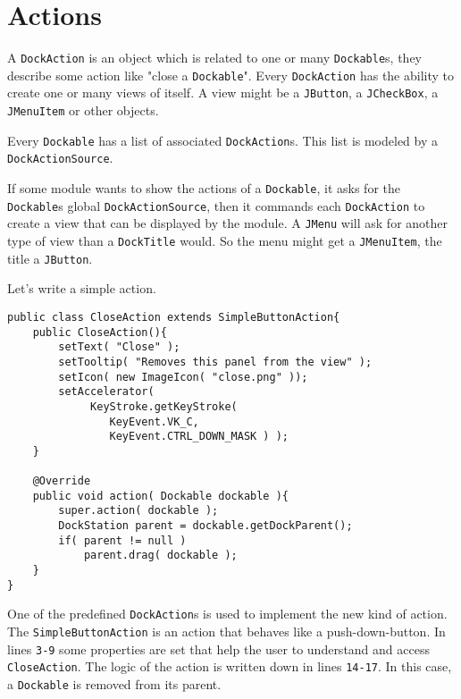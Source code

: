 \documentclass[a4paper,10pt]{article}
\newcommand{\src}[1]{\lstinline[basicstyle=\normalsize\ttfamily,keywordstyle=\normalsize\ttfamily,identifierstyle=\normalsize\ttfamily]|#1|}
\begin{document}
\section{Actions}
A \src{DockAction} is an object which is related to one or many \src{Dockable}s, they describe some action like "close a \src{Dockable}". Every \src{DockAction} has the ability to create one or many views of itself. A view might be a \src{JButton}, a \src{JCheckBox}, a \src{JMenuItem} or other objects.

Every \src{Dockable} has a list of associated \src{DockAction}s. This list is modeled by a \src{DockActionSource}. 

If some module wants to show the actions of a \src{Dockable}, it asks for the \src{Dockable}s global \src{DockActionSource}, then it commands each \src{DockAction} to create a view that can be displayed by the module. A \src{JMenu} will ask for another type of view than a \src{DockTitle} would. So the menu might get a \src{JMenuItem}, the title a \src{JButton}.

Let's write a simple action.
\begin{lstlisting}
public class CloseAction extends SimpleButtonAction{
	public CloseAction(){
		setText( "Close" );
		setTooltip( "Removes this panel from the view" );
		setIcon( new ImageIcon( "close.png" ));
		setAccelerator(
			 KeyStroke.getKeyStroke(
				KeyEvent.VK_C,
				KeyEvent.CTRL_DOWN_MASK ) );
	}

	@Override
	public void action( Dockable dockable ){
		super.action( dockable );
		DockStation parent = dockable.getDockParent();
		if( parent != null )
			parent.drag( dockable );
	}
}
\end{lstlisting}
One of the predefined \src{DockAction}s is used to implement the new kind of action. The \src{SimpleButtonAction} is an action that behaves like a push-down-button. In lines \src{3-9} some properties are set that help the user to understand and access \src{CloseAction}. The logic of the action is written down in lines \src{14-17}. In this case, a \src{Dockable} is removed from its parent.
\end{document}
